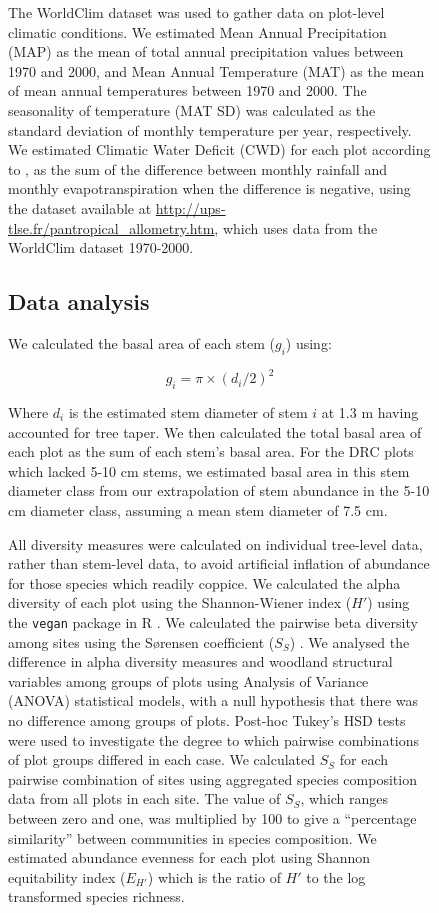 \documentclass[diversity,article,submit,moreauthors,pdftex]{Definitions/mdpi}
\begin{document}
\begin{figure}[H]
The WorldClim dataset \citep{Fick2017} was used to gather data on plot-level climatic conditions. We estimated Mean Annual Precipitation (MAP) as the mean of total annual precipitation values between 1970 and 2000, and Mean Annual Temperature (MAT) as the mean of mean annual temperatures between 1970 and 2000. The seasonality of temperature (MAT SD) was calculated as the standard deviation of monthly temperature per year, respectively. We estimated Climatic Water Deficit (CWD) for each plot according to \citep{Chave2014}, as the sum of the difference between monthly rainfall and monthly evapotranspiration when the difference is negative, using the dataset available at \url{http://ups-tlse.fr/pantropical_allometry.htm}, which uses data from the WorldClim dataset 1970-2000.

\subsection{Data analysis}

We calculated the basal area of each stem ($g_{i}$) using:

\begin{equation}
	g_{i} = \pi{} \times (d_{i} / 2)^{2}
\end{equation}

Where $d_{i}$ is the estimated stem diameter of stem $i$ at 1.3 m having accounted for tree taper. We then calculated the total basal area of each plot as the sum of each stem's basal area. For the DRC plots which lacked 5-10 cm stems, we estimated basal area in this stem diameter class from our extrapolation of stem abundance in the 5-10 cm diameter class, assuming a mean stem diameter of 7.5 cm.

All diversity measures were calculated on individual tree-level data, rather than stem-level data, to avoid artificial inflation of abundance for those species which readily coppice. We calculated the alpha diversity of each plot using the Shannon-Wiener index ($H'$) %
using the \texttt{vegan} package in R \citep{vegan}.
We calculated the pairwise beta diversity among sites using the S\o{}rensen coefficient ($S_{S}$) %
\citep{Koleff2003}. We analysed the difference in alpha diversity measures and woodland structural variables among groups of plots using Analysis of Variance (ANOVA) statistical models, with a null hypothesis that there was no difference among groups of plots. Post-hoc Tukey's HSD tests were used to investigate the degree to which pairwise combinations of plot groups differed in each case.
We calculated $S_{S}$ for each pairwise combination of sites using aggregated species composition data from all plots in each site. The value of $S_{S}$, which ranges between zero and one, was multiplied by 100 to give a ``percentage similarity'' between communities in species composition. We estimated abundance evenness for each plot using Shannon equitability index ($E_{H'}$) \citep{Smith1996} which is the ratio of $H'$ to the log transformed species richness.


\end{figure}
\end{document}

